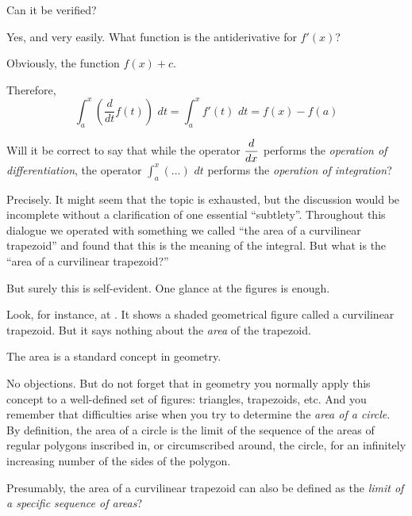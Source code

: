 \rdr Can it be verified?

\athr Yes, and very easily. What function is the antiderivative for $f' (x)$?

\rdr Obviously, the function $f (x) + c$. 

\athr Therefore,
\begin{equation*}%
 \int_{a}^{x} \left( \dfrac{d}{dt} f(t) \right) \,\, dt =  \int_{a}^{x} f'(t) \,\, dt = f(x) - f(a)
\end{equation*}

\rdr Will it be correct to say that while the operator $\dfrac{d}{dx}$ performs the \emph{operation of differentiation}, the operator $\displaystyle\int_{a}^{x} (\ldots) \,\, dt$ performs the \emph{operation of integration}?

\athr Precisely. It might seem that the topic is exhausted, but the discussion would be incomplete without a clarification of one essential ``subtlety''. Throughout this dialogue we operated with something we called ``the area of a curvilinear trapezoid'' and found that this is the meaning of the integral. But what is the ``area of a curvilinear trapezoid?''

\rdr But surely this is self-evident. One glance at the figures is enough.

\athr Look, for instance, at . It shows a shaded geometrical figure called a curvilinear trapezoid. But it says nothing about the \emph{area} of the trapezoid.

\rdr The area is a standard concept in geometry.

\athr No objections. But do not forget that in geometry you normally apply this concept to a well-defined set of figures: triangles, trapezoids, etc. And you remember that difficulties arise when you try to determine the \emph{area of a circle}. By definition, the area of a circle is the limit of the sequence of the areas of regular polygons inscribed in, or circumscribed around, the circle, for an infinitely increasing number of the sides of the polygon.

\rdr Presumably, the area of a curvilinear trapezoid can also be defined as the \emph{limit of a specific sequence of areas}? 

